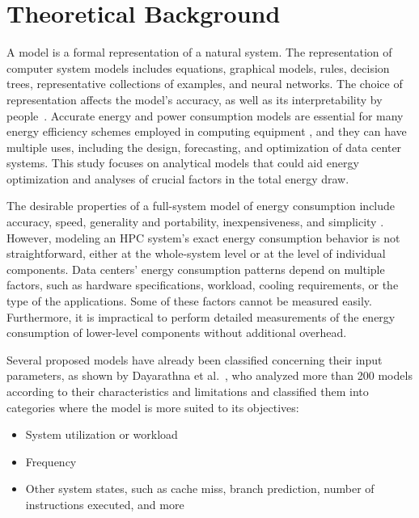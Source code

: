 \section{Theoretical Background} \label{sec:theoretical_background}

A model is a formal representation of a natural system. The representation of computer system models includes equations, graphical models, rules, decision trees, representative collections of examples, and neural networks. The choice of representation affects the model's accuracy, as well as its interpretability by people~\cite{Hypothesis2012EncyclopediaLearning, Roy2019ForecastingNetwork, Zhu2019PredictingLearning}. Accurate energy and power consumption models are essential for many energy efficiency schemes employed in computing equipment \cite{Rivoire2007ModelsOptimizations}, and they can have multiple uses, including the design, forecasting, and optimization of data center systems. This study focuses on analytical models that could aid energy optimization and analyses of crucial factors in the total energy draw.

The desirable properties of a full-system model of energy consumption include accuracy, speed, generality and portability, inexpensiveness, and simplicity \cite{Rivoire2008AModels}. However, modeling an HPC system's exact energy consumption behavior is not straightforward, either at the whole-system level or at the level of individual components. Data centers' energy consumption patterns depend on multiple factors, such as hardware specifications, workload, cooling requirements, or the type of the applications. Some of these factors cannot be measured easily. Furthermore, it is impractical to perform detailed measurements of the energy consumption of lower-level components without additional overhead.

Several proposed models have already been classified concerning their input parameters, as shown by Dayarathna et al.~\cite{Dayarathna2016DataSurvey}, who analyzed more than 200 models according to their characteristics and limitations and classified them into categories where the model is more suited to its objectives:
\begin{itemize}
	\item System utilization or workload
	\item Frequency
	\item Other system states, such as cache miss, branch prediction, number of instructions executed, and more
	\label{tab:input_type}
\end{itemize}

